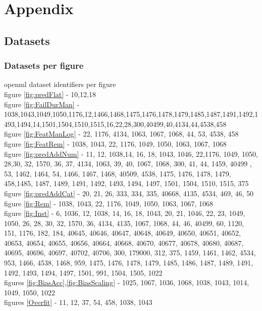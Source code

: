 \documentclass[a4paper,10pt]{article}
\begin{document}
\section{Appendix}
\subsection{Datasets}
\subsubsection{Datasets per figure}
openml dataset identifiers per figure \\
figure \ref{fig:predFlat} - 10,12,18 \\
figure \ref{fig:FailDurMan} - 1038,1043,1049,1050,1176,12,1466,1468,1475,1476,1478,1479,1485,1487,1491,1492,1493,1494,14,1501,1504,1510,1515,16,22,28,300,40499,40,4134,44,4538,458 \\
figure \ref{fig:FeatManLog} - 22, 1176, 4134, 1063, 1067, 1068, 44, 53, 4538, 458 \\
figure \ref{fig:FeatRem} - 1038, 1043, 22, 1176, 1049, 1050, 1063, 1067, 1068 \\
figure \ref{fig:predAddNum} - 11, 12, 1038,14, 16, 18, 1043, 1046, 22,1176, 1049, 1050, 28,30, 32, 1570, 36, 37, 4134, 1063, 39, 40, 1067, 1068, 300, 41, 44, 1459, 40499 , 53, 1462, 1464, 54, 1466, 1467, 1468, 40509, 4538, 1475, 1476, 1478, 1479, 458,1485, 1487, 1489, 1491, 1492, 1493, 1494, 1497, 1501, 1504, 1510, 1515, 375\\ 
figure \ref{fig:predAddCat} - 20, 21, 26, 333, 334, 335, 40668, 4135, 4534, 469, 46, 50\\
figure \ref{fig:Rem} - 1038, 1043, 22, 1176, 1049, 1050, 1063, 1067, 1068 \\
figure \ref{fig:Inst} - 6, 1036, 12, 1038, 14, 16, 18, 1043, 20, 21, 1046, 22, 23, 1049, 1050, 26, 28, 30, 32, 1570, 36, 4134, 4135, 1067, 1068, 44, 46, 40499, 60, 1120, 151, 1176, 182, 184, 40645, 40646, 40647, 40648, 40649, 40650, 40651, 40652, 40653, 40654, 40655, 40656, 40664, 40668, 40670, 40677, 40678, 40680, 40687, 40695, 40696, 40697, 40702, 40706, 300, 179000, 312, 375, 1459, 1461, 1462, 4534, 953, 1466, 4538, 1468, 959, 1475, 1476, 1478, 1479, 1485, 1486, 1487, 1489, 1491, 1492, 1493, 1494, 1497, 1501, 991, 1504, 1505, 1022 \\
figures \ref{fig:BiasAcc},\ref{fig:BiasScaling} - 1025, 1067, 1036, 1068, 1038, 1043, 1014, 1049, 1050, 1022 \\ 
figures \ref{Overfit} - 11, 12, 37, 54, 458, 1038, 1043
\end{document}
